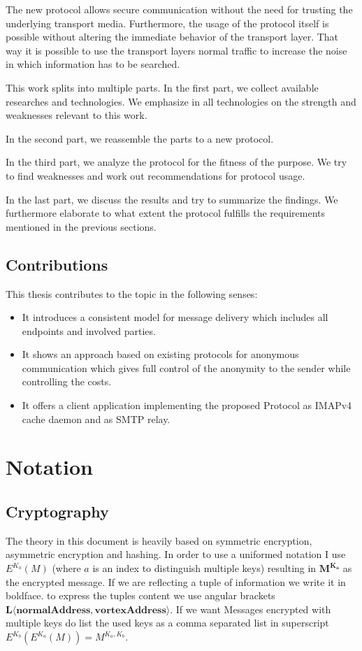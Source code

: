 The new protocol allows secure communication without the need for trusting the underlying transport media. Furthermore, the usage of the protocol itself is possible without altering the immediate behavior of the transport layer. That way it is possible to use the transport layers normal traffic to increase the noise in which information has to be searched. 

This work splits into multiple parts. In the first part, we collect available researches and technologies. We emphasize in all technologies on the strength and weaknesses relevant to this work. 

In the second part, we reassemble the parts to a new protocol. 

In the third part, we analyze the protocol for the fitness of the purpose. We try to find weaknesses and work out recommendations for protocol usage. 

In the last part, we discuss the results and try to summarize the findings. We furthermore elaborate to what extent the protocol fulfills the requirements mentioned in the previous sections.

\section{Contributions}
This thesis contributes to the topic in the following senses:
\begin{itemize}
	\item It introduces a consistent model for message delivery which includes all endpoints and involved parties.
	\item It shows an approach based on existing protocols for anonymous communication which gives full control of the anonymity to the sender while controlling the costs.
	\item It offers a client application implementing the proposed Protocol as IMAPv4 cache daemon and as SMTP relay.
\end{itemize}

\chapter{Notation}
\section{Cryptography \label{sec:encNot}}
The theory in this document is heavily based on symmetric encryption, asymmetric encryption and hashing. In order to use a uniformed notation I use $E^{K_a}(M)$ (where $a$ is an index to distinguish multiple keys) resulting in $\mathbf{M^{K_a}}$ as the encrypted message. If we are reflecting a tuple of information we write it in boldface. to express the tuples content we use angular brackets $\mathbf{L\langle normalAddress,vortexAddress\rangle }$. If we want Messages encrypted with multiple keys do list the used keys as a comma separated list in superscript $E^{K_b}\left(E^{K_a}\left(M\right)\right)=M^{{K_{a}},{K_b}}$.

